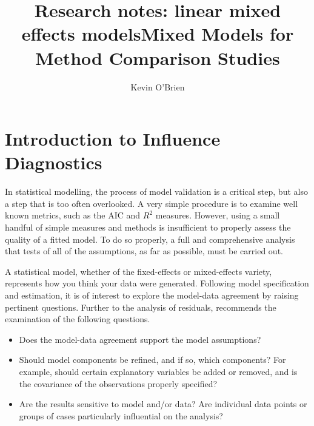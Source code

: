 \documentclass[12pt, a4paper]{report}
\title{Research notes: linear mixed effects models}
\author{ } \date{ }
\theoremstyle{plain}
\theoremstyle{definition}
\theoremstyle{remark}
\begin{document}
	\author{Kevin O'Brien}
	\title{Mixed Models for Method Comparison Studies}
	\tableofcontents
	\section{Introduction to Influence Diagnostics}

	In statistical modelling, the process of model validation is a critical step, but also a step that is too often overlooked. A very simple procedure is to examine well known
	metrics, such as the AIC and $R^2$ measures. However, using a small handful of simple measures and methods is insufficient to properly assess the quality of a fitted model. To do so properly, a full and comprehensive
	analysis that tests of all of the assumptions, as far as possible, must be carried out. 
	
	A statistical model, whether of the fixed-effects or mixed-effects variety, represents how you think your data were generated. Following model specification and estimation, it is of interest to explore the model-data
	agreement by raising pertinent questions. Further to the analysis of residuals, \citet{schabenberger} recommends the examination of the following questions.
	\begin{itemize}
		\item Does the model-data agreement support the model assumptions?
		\item Should model components be refined, and if so, which components? For example, should certain explanatory variables
		be added or removed, and is the covariance of the observations properly specified?
		\item Are the results sensitive to model and/or data? Are individual data points or groups of cases particularly
		influential on the analysis?
	\end{itemize}
	
\end{document}
